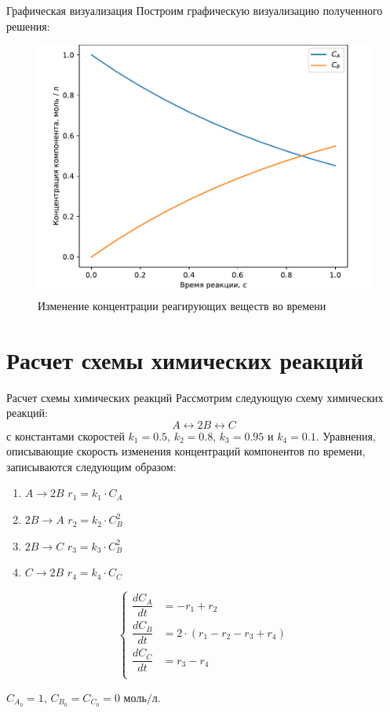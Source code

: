 \documentclass[aspectratio=169, mathserif]{beamer}	%
\begin{document}
\begin{frame}[fragile, ]{Графическая визуализация}
\scriptsize
Построим графическую визуализацию полученного решения:
\vfill
\begin{figure}[h!]
	\centering
	\includegraphics[width=.6\linewidth]{./pics/figure_64}
	\caption{Изменение концентрации реагирующих веществ во времени}
	\label{fig:fig_64}
\end{figure}
\vfill
\end{frame}


\section{Расчет схемы химических реакций}
\begin{frame}[fragile, ]{Расчет схемы химических реакций}
\scriptsize
Рассмотрим следующую схему химических реакций:
\vfill
$$
	A \longleftrightarrow 2B \longleftrightarrow C
$$
\vfill
\noindent с константами скоростей $k_1=0.5$, $k_2=0.8$, $k_3=0.95$ и $k_4=0.1$.
Уравнения, описывающие скорость изменения концентраций компонентов по времени, записываются следующим образом:
\vfill
\begin{minipage}{.49\textwidth}
\begin{enumerate}
\item $A \longrightarrow 2B$ \qquad $r_1 = k_1 \cdot C_A$
\item $2B \longrightarrow A$ \qquad $r_2 = k_2 \cdot C_B ^2$
\item $2B \longrightarrow C$ \qquad $r_3 = k_3 \cdot C_B ^2$
\item $C \longrightarrow 2B$ \qquad $r_4 = k_4 \cdot C_C$
\end{enumerate}
\end{minipage}
\begin{minipage}{.5\textwidth}
\begin{equation*}
	\left\{
	\begin{aligned}
		\dfrac{dC_A}{dt} &= -r_1 + r_2 \\
		\dfrac{dC_B}{dt} &=  2 \cdot \left(r_1 - r_2 - r_3 + r_4\right) \\
		\dfrac{dC_C}{dt} &=  r_3 - r_4 \\
	\end{aligned}
	\right.
\end{equation*}
\end{minipage}
\vfill
$C_{A_0} = 1$, $C_{B_0} = C_{C_0} = 0$ $\mathrm{моль/л}$.
\vfill
\end{frame}
\end{document}
